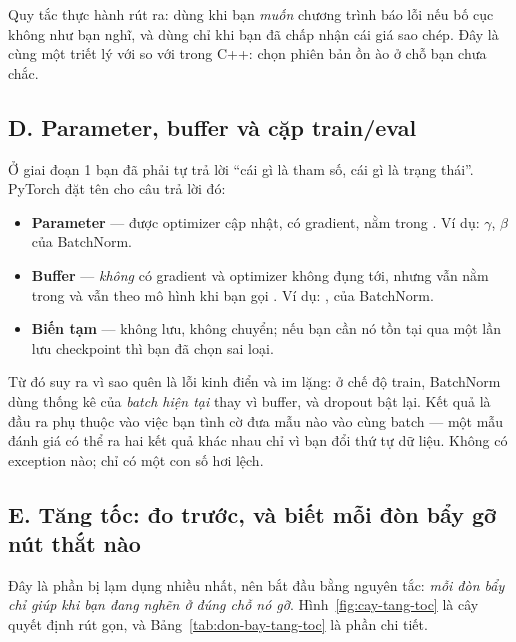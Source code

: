 \documentclass[../../../deep_learning.tex]{subfiles}
\begin{document}
Quy tắc thực hành rút ra: dùng  khi bạn \emph{muốn} chương trình báo lỗi nếu bố cục không như bạn nghĩ, và dùng  chỉ khi bạn đã chấp nhận cái giá sao chép. Đây là cùng một triết lý với  so với  trong C++: chọn phiên bản ồn ào ở chỗ bạn chưa chắc.

\subsection{D. Parameter, buffer và cặp train/eval}
Ở giai đoạn 1 bạn đã phải tự trả lời ``cái gì là tham số, cái gì là trạng thái''. PyTorch đặt tên cho câu trả lời đó:

\begin{itemize}
\item \textbf{Parameter} --- được optimizer cập nhật, có gradient, nằm trong . Ví dụ: $\gamma$, $\beta$ của BatchNorm.
\item \textbf{Buffer} --- \emph{không} có gradient và optimizer không đụng tới, nhưng vẫn nằm trong  và vẫn theo mô hình khi bạn gọi . Ví dụ: ,  của BatchNorm.
\item \textbf{Biến tạm} --- không lưu, không chuyển; nếu bạn cần nó tồn tại qua một lần lưu checkpoint thì bạn đã chọn sai loại.
\end{itemize}

Từ đó suy ra vì sao quên  là lỗi kinh điển và im lặng: ở chế độ train, BatchNorm dùng thống kê của \emph{batch hiện tại} thay vì buffer, và dropout bật lại. Kết quả là đầu ra phụ thuộc vào việc bạn tình cờ đưa mẫu nào vào cùng batch --- một mẫu đánh giá có thể ra hai kết quả khác nhau chỉ vì bạn đổi thứ tự dữ liệu. Không có exception nào; chỉ có một con số hơi lệch.


\subsection{E. Tăng tốc: đo trước, và biết mỗi đòn bẩy gỡ nút thắt nào}
Đây là phần bị lạm dụng nhiều nhất, nên bắt đầu bằng nguyên tắc: \emph{mỗi đòn bẩy chỉ giúp khi bạn đang nghẽn ở đúng chỗ nó gỡ}. Hình~\ref{fig:cay-tang-toc} là cây quyết định rút gọn, và Bảng~\ref{tab:don-bay-tang-toc} là phần chi tiết.
\end{document}
